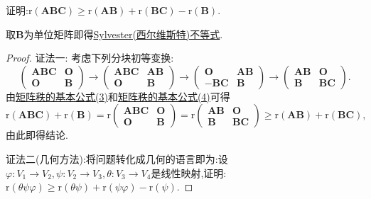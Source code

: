 \documentclass[../../main.tex]{subfiles}
\begin{document}
\begin{proposition}\label{proposition:Frobenius(弗罗贝尼乌斯)不等式}证明:\(\mathrm{r}(\boldsymbol{A}\boldsymbol{B}\boldsymbol{C})\geqslant \mathrm{r}(\boldsymbol{A}\boldsymbol{B})+\mathrm{r}(\boldsymbol{B}\boldsymbol{C})-\mathrm{r}(\boldsymbol{B})\).
\end{proposition}
\begin{remark}
取$\boldsymbol{B}$为单位矩阵即得\hyperref[proposition:Sylvester(西尔维斯特)不等式]{Sylvester(西尔维斯特)不等式}.
\end{remark}
\begin{proof}
{\color{blue}证法一:}
考虑下列分块初等变换:
\[
\begin{pmatrix}
\boldsymbol{A}\boldsymbol{B}\boldsymbol{C}&\boldsymbol{O}\\
\boldsymbol{O}&\boldsymbol{B}
\end{pmatrix}\to
\begin{pmatrix}
\boldsymbol{A}\boldsymbol{B}\boldsymbol{C}&\boldsymbol{A}\boldsymbol{B}\\
\boldsymbol{O}&\boldsymbol{B}
\end{pmatrix}\to
\begin{pmatrix}
\boldsymbol{O}&\boldsymbol{A}\boldsymbol{B}\\
-\boldsymbol{B}\boldsymbol{C}&\boldsymbol{B}
\end{pmatrix}\to
\begin{pmatrix}
\boldsymbol{A}\boldsymbol{B}&\boldsymbol{O}\\
\boldsymbol{B}&\boldsymbol{B}\boldsymbol{C}
\end{pmatrix}.
\]
由\hyperref[矩阵秩的基本公式3]{矩阵秩的基本公式(3)}和\hyperref[矩阵秩的基本公式4]{矩阵秩的基本公式(4)}可得
\[
\mathrm{r}(\boldsymbol{A}\boldsymbol{B}\boldsymbol{C})+\mathrm{r}(\boldsymbol{B})=\mathrm{r}\begin{pmatrix}
\boldsymbol{A}\boldsymbol{B}\boldsymbol{C}&\boldsymbol{O}\\
\boldsymbol{O}&\boldsymbol{B}
\end{pmatrix}=\mathrm{r}\begin{pmatrix}
\boldsymbol{A}\boldsymbol{B}&\boldsymbol{O}\\
\boldsymbol{B}&\boldsymbol{B}\boldsymbol{C}
\end{pmatrix}\geqslant \mathrm{r}(\boldsymbol{A}\boldsymbol{B})+\mathrm{r}(\boldsymbol{B}\boldsymbol{C}),
\]
由此即得结论. 

{\color{blue}证法二(几何方法):}将问题转化成几何的语言即为:设\(\varphi:V_1\to V_2,\psi:V_2\to V_3,\theta:V_3\to V_4\)是线性映射,证明:\(\text{r}(\theta\psi\varphi)\geqslant \text{r}(\theta\psi)+\text{r}(\psi\varphi)-\text{r}(\psi)\).


\end{proof}
\end{document}
